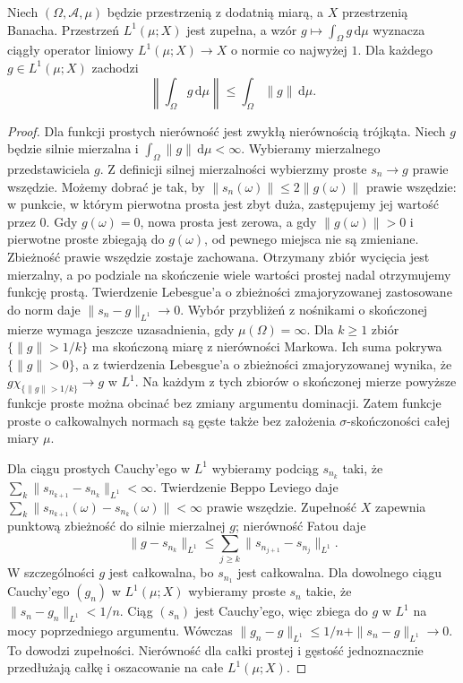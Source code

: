 \begin{twierdzenie}
\label{thm:bochner-basic-30}
Niech $(\Omega,\mathcal A,\mu)$ będzie przestrzenią
z dodatnią miarą, a $X$ przestrzenią Banacha.
Przestrzeń $L^1(\mu;X)$ jest zupełna, a wzór
$g\mapsto\int_\Omega g\,\mathrm d\mu$ wyznacza
ciągły operator liniowy $L^1(\mu;X)\to X$
o normie co najwyżej $1$. Dla każdego $g\in L^1(\mu;X)$
zachodzi
\[
 \left\|\int_\Omega g\,\mathrm d\mu\right\|
 \le\int_\Omega\|g\|\,\mathrm d\mu.
\]
\end{twierdzenie}
\begin{proof}
Dla funkcji prostych nierówność jest zwykłą nierównością
trójkąta. Niech $g$ będzie silnie mierzalna i
$\int_\Omega\|g\|\,\mathrm d\mu<\infty$.
Wybieramy mierzalnego przedstawiciela $g$.
Z definicji silnej mierzalności wybierzmy proste
$s_n\to g$ prawie wszędzie. Możemy dobrać je tak, by
$\|s_n(\omega)\|\le2\|g(\omega)\|$ prawie wszędzie:
w punkcie, w którym pierwotna prosta jest zbyt duża,
zastępujemy jej wartość przez $0$. Gdy $g(\omega)=0$,
nowa prosta jest zerowa, a gdy $\|g(\omega)\|>0$
i pierwotne proste zbiegają do $g(\omega)$,
od pewnego miejsca nie są zmieniane. Zbieżność
prawie wszędzie zostaje zachowana. Otrzymany zbiór
wycięcia jest mierzalny, a po podziale na skończenie
wiele wartości prostej nadal otrzymujemy funkcję prostą.
Twierdzenie Lebesgue'a o zbieżności zmajoryzowanej
zastosowane do norm daje $\|s_n-g\|_{L^1}\to0$.
Wybór przybliżeń z nośnikami o skończonej mierze
wymaga jeszcze uzasadnienia, gdy $\mu(\Omega)=\infty$.
Dla $k\ge1$ zbiór $\{\|g\|>1/k\}$ ma skończoną
miarę z nierówności Markowa. Ich suma pokrywa
$\{\|g\|>0\}$, a z twierdzenia Lebesgue'a
o zbieżności zmajoryzowanej wynika,
że $g\chi_{\{\|g\|>1/k\}}\to g$ w $L^1$.
Na każdym z tych zbiorów o skończonej mierze
powyższe funkcje proste można obcinać bez zmiany
argumentu dominacji. Zatem funkcje proste
o całkowalnych normach są gęste także bez
założenia $\sigma$-skończoności całej miary $\mu$.

Dla ciągu prostych Cauchy'ego w $L^1$ wybieramy
podciąg $s_{n_k}$ taki, że
$\sum_k\|s_{n_{k+1}}-s_{n_k}\|_{L^1}<\infty$.
Twierdzenie Beppo Leviego daje
$\sum_k\|s_{n_{k+1}}(\omega)-s_{n_k}(\omega)\|<\infty$
prawie wszędzie. Zupełność $X$ zapewnia punktową
zbieżność do silnie mierzalnej $g$; nierówność Fatou
daje
\[
 \|g-s_{n_k}\|_{L^1}
 \le \sum_{j\ge k}\|s_{n_{j+1}}-s_{n_j}\|_{L^1}.
\]
W szczególności $g$ jest całkowalna, bo $s_{n_1}$
jest całkowalna. Dla dowolnego ciągu Cauchy'ego
$(g_n)$ w $L^1(\mu;X)$ wybieramy proste $s_n$
takie, że $\|s_n-g_n\|_{L^1}<1/n$.
Ciąg $(s_n)$ jest Cauchy'ego, więc zbiega do $g$
w $L^1$ na mocy poprzedniego argumentu.
Wówczas $\|g_n-g\|_{L^1}\le1/n+\|s_n-g\|_{L^1}\to0$.
To dowodzi zupełności. Nierówność dla całki
prostej i gęstość jednoznacznie przedłużają całkę
i oszacowanie na całe $L^1(\mu;X)$.
\end{proof}

